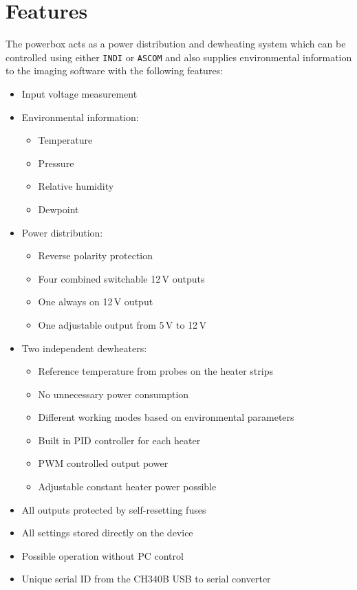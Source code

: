 \documentclass{scrartcl}
\begin{document}
\section{Features}
The powerbox acts as a power distribution and dewheating system which can be
controlled using either \texttt{INDI} or \texttt{ASCOM} and also supplies
environmental information to the imaging software with the following features:
\begin{itemize}
  \item Input voltage measurement
  \item Environmental information:
    \begin{itemize}
      \item Temperature
      \item Pressure
      \item Relative humidity
      \item Dewpoint
    \end{itemize}
  \item Power distribution:
    \begin{itemize}
      \item Reverse polarity protection
      \item Four combined switchable 12\,V outputs
      \item One always on 12\,V output
      \item One adjustable output from 5\,V to 12\,V
    \end{itemize}
  \item Two independent dewheaters:
    \begin{itemize}
      \item Reference temperature from probes on the heater strips
      \item No unnecessary power consumption
      \item Different working modes based on environmental parameters
      \item Built in PID controller for each heater
      \item PWM controlled output power
      \item Adjustable constant heater power possible
    \end{itemize}
  \item All outputs protected by self-resetting fuses
  \item All settings stored directly on the device
  \item Possible operation without PC control
  \item Unique serial ID from the CH340B USB to serial converter
\end{itemize}
\end{document}
